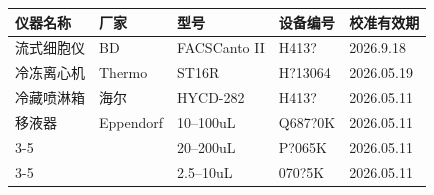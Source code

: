 \documentclass[UTF8,10pt,a4paper,fontset=fandol]{ctexart}
\newcommand{\fieldvalue}[1]{#1}
\newcommand{\handwritten}[1]{#1}
\begin{document}
\begin{center}
\small
\begin{tabularx}{\textwidth}{|p{}|p{}|p{}|X|p{}|}
\hline
仪器名称 & 厂家 & 型号 & 设备编号 & 校准有效期 \\ \hline
流式细胞仪 & BD & FACSCanto II &
\fieldvalue{\handwritten{H413?}} &
\fieldvalue{\handwritten{2026.9.18}} \\ \hline
冷冻离心机 & Thermo & ST16R &
\fieldvalue{\handwritten{H?13064}} &
\fieldvalue{\handwritten{2026.05.19}} \\ \hline
冷藏喷淋箱 & 海尔 & HYCD-282 &
\fieldvalue{\handwritten{H413?}} &
\fieldvalue{\handwritten{2026.05.11}} \\ \hline
移液器 & Eppendorf &
\fieldvalue{\handwritten{10--100uL}} &
\fieldvalue{\handwritten{Q687?0K}} &
\fieldvalue{\handwritten{2026.05.11}} \\ \cline{3-5}
& &
\fieldvalue{\handwritten{20--200uL}} &
\fieldvalue{\handwritten{P?065K}} &
\fieldvalue{\handwritten{2026.05.11}} \\ \cline{3-5}
& &
\fieldvalue{\handwritten{2.5--10uL}} &
\fieldvalue{\handwritten{070?5K}} &
\fieldvalue{\handwritten{2026.05.11}} \\ \hline
\end{tabularx}
\end{center}
\end{document}
